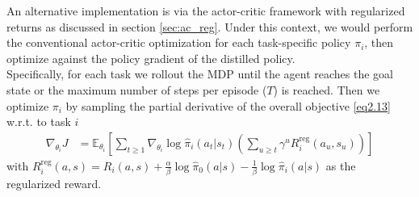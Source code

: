 \documentclass[12pt]{report}
\begin{document}
An alternative implementation is via the actor-critic framework with regularized returns as discussed in section \ref{sec:ac_reg}. Under this context, we would perform the conventional actor-critic optimization for each task-specific policy $\pi_i$, then optimize against the policy gradient of the distilled policy.\\

Specifically, for each task we rollout the MDP until the agent reaches the goal state or the maximum number of steps per episode ($T$) is reached. Then we optimize $\pi_i$ by sampling the partial derivative of the overall objective \ref{eq2.13} w.r.t. to task $i$
\begin{align}
    \nabla_{\theta_i}J &= \mathbb{E}_{\theta_i}\left[\sum_{t\ge1}\nabla_{\theta_i}\log \hat{\pi}_i(a_t|s_t)\left(\sum_{u\ge t}\gamma^u R_i^{\text{reg}}(a_u,s_u)\right)\right] \label{eq2.32}
\end{align}
with $R_i^{\text{reg}}(a,s) = R_i(a,s)+\frac{\alpha}{\beta}\log \hat{\pi}_0(a|s)-\frac{1}{\beta}\log\hat{\pi}_i(a|s)$ as the regularized reward.\\
\end{document}
